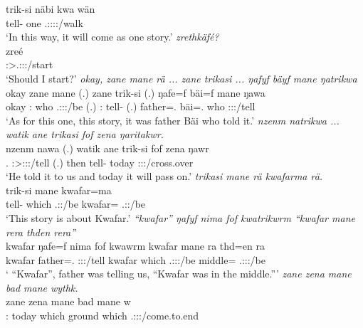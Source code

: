 \begin{exe}
	\gll trik-si näbi kwa wän\\ 
	tell-{\Nmlz} one {\Fut} \Tsg.\F:\Sbj:\Nonpast:\Ipfv:\Venit/walk\\
	\trans `In this way, it will come as one story.'
	\emph{zrethkäfé?}\\
	\gll zreé\\ 
	\Fsg:\Sbj>\Tsg.\F:\Obj:\Irr:\Pfv/start\\
	\trans `Should I start?'
	\emph{okay, zane mane rä ... zane trikasi ... ŋafyf bäyf mane ŋatrikwa}\\
	\gll okay zane mane  (.) zane trik-si (.) ŋafe=f bäi=f mane ŋawa\\ 
	okay \Dem:{\Prox} who \Tsg.\F:\Sbj:\Nonpast:\Ipfv/be (.) \Dem:{\Prox} tell-{\Nmlz} (.) father=\Erg.{\Sg} bäi=\Erg.{\Sg} who \Sg:\Sbj:\Pst:\Ipfv/tell\\
	\trans `As for this one, this story, it was father Bäi who told it.'
	\emph{nzenm natrikwa ... watik ane trikasi fof zena ŋaritakwr.}\\
	\gll nzenm nawa (.) watik ane trik-si fof zena ŋawr\\ 
	\Fnsg.{\Dat} \Sg:\Sbj>\Fpl:\Io:\Pst:\Ipfv/tell (.) then {\Dem} tell-{\Nmlz} {\Emph} today \Stsg:\Sbj:\Nonpast:\Ipfv/cross.over\\
	\trans `He told it to us and today it will pass on.'
	\emph{trikasi mane rä kwafarma rä.}\\
	\gll trik-si mane  kwafar=ma \\ 
	tell-{\Nmlz} which \Tsg.\F:\Nonpast:\Ipfv/be kwafar={\Char} \Tsg.\F:\Nonpast:\Ipfv/be\\
	\trans `This story is about Kwafar.'
	\emph{``kwafar'' ŋafyf nima fof kwatrikwrm ``kwafar mane rera thden rera''}\\
	\gll kwafar ŋafe=f nima fof kwawrm kwafar mane ra thd=en ra\\ 
	kwafar father=\Erg.{\Sg} {\Quot} {\Emph} \Sg:\Sbj:\Pst:\Dur/tell kwafar which \Tsg.\F:\Sbj:\Pst:\Ipfv/be middle={\Loc} \Tsg.\F:\Sbj:\Pst:\Ipfv/be\\
	\trans ` ``Kwafar'', father was telling us, ``Kwafar was in the middle.'''
	\emph{zane zena mane bad mane wythk.}\\
	\gll zane zena mane bad mane w\\ 
	\Dem:{\Prox} today which ground which \Tsg.\F:\Sbj:\Nonpast:\Ipfv/come.to.end\\

\end{exe}
